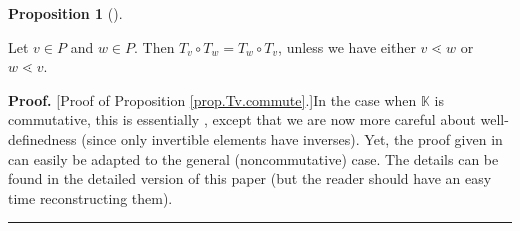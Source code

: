 \documentclass[numbers=enddot,12pt,final,onecolumn,notitlepage]{scrartcl}%
\theoremstyle{definition}
\newtheorem{prop}[theo]{Proposition}
\newenvironment{proposition}[1][]
{\begin{prop}[#1]\begin{leftbar}}
{\end{leftbar}\end{prop}}
\newenvironment{vershort}{}{}
\newenvironment{proof}[1][Proof]{\noindent\textbf{#1.} }{\ \rule{0.5em}{0.5em}}
\begin{document}
\begin{proposition}
\label{prop.Tv.commute}Let $v\in P$ and $w\in P$. Then $T_{v}\circ T_{w}%
=T_{w}\circ T_{v}$, unless we have either $v\lessdot w$ or $w\lessdot v$.
\end{proposition}

\begin{vershort}


\begin{proof}
[Proof of Proposition \ref{prop.Tv.commute}.]In the case when $\mathbb{K}$ is
commutative, this is essentially \cite[Proposition 14]{bir-row-1}, except that
we are now more careful about well-definedness (since only invertible elements
have inverses). Yet, the proof given in \cite{bir-row-1} can easily be adapted
to the general (noncommutative) case. The details can be found in the detailed
version of this paper (but the reader should have an easy time reconstructing them).
\end{proof}
\end{vershort}
\end{document}
